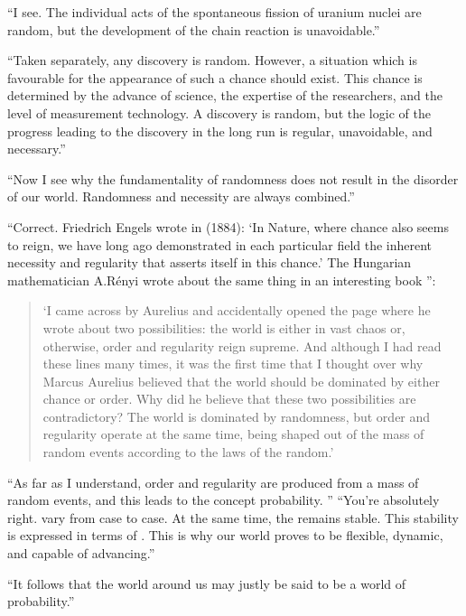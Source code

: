 \begin{dialogue}
\rdr  ``I see. The individual acts of the spontaneous
  fission of uranium nuclei are random, but the development of the
  chain reaction is unavoidable.''

\athr  ``Taken separately, any discovery is
  random. However, a situation which is favourable for the appearance
  of such a chance should exist. This chance is determined by the
  advance of science, the expertise of the researchers, and the level
  of measurement technology. A discovery is random, but the logic of
  the progress leading to the discovery in the long run is regular,
  unavoidable, and necessary.''

\rdr  ``Now I see why the fundamentality of randomness does not
result in the disorder of our world. Randomness and necessity are
always combined.''

\athr   ``Correct. Friedrich Engels wrote in  (1884):
   `In Nature, where chance also seems to reign, we have long ago
    demonstrated in each particular field the inherent necessity and
    regularity that asserts itself in this chance.' The Hungarian
    mathematician A.R\'enyi wrote about the same thing in an
    interesting book '':  
    \begin{quote}
    `I came across  by
    Aurelius and accidentally opened the page where he wrote about two
    possibilities: the world is either in vast chaos or, otherwise,
    order and regularity reign supreme. And although I had read these
    lines many times, it was the first time that I thought over why
    Marcus Aurelius believed that the world should be dominated by
    either chance or order. Why did he believe that these two
    possibilities are contradictory? The world is dominated by
    randomness, but order and regularity operate at the same time,
    being shaped out of the mass of random events according to the
    laws of the random.'
	\end{quote}
\rdr  ``As far as I understand, order and regularity are
  produced from a mass of random events, and this leads to the concept
  probability.
''
\athr  ``You're absolutely right.  vary
  from case to case. At the same time, the  remains
  stable. This stability is expressed in terms of . This is
  why our world proves to be flexible, dynamic, and capable of advancing.''

\rdr  ``It follows that the world around us may justly be
  said to be a world of probability.''


\end{dialogue}
